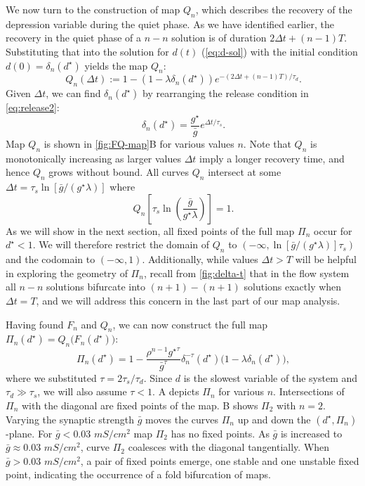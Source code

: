 \documentclass[utf8]{frontiersFPHY} %
\newcommand{\dstar}{d^\star}
\newcommand{\gbar}{\bar g}
\newcommand{\delt}{\Delta t}
\newcommand{\dn}{\delta_n}
\begin{document}
We now turn to the construction of map $Q_{n}$, which describes the recovery of the depression variable during the quiet phase.
As we have identified earlier, the recovery in the quiet phase of a $n-n$ solution is of duration $2\delt +(n-1)T$.
Substituting that into the solution for $d(t)$ (\cref{eq:d-sol}) with the initial condition $d(0)=\dn(\dstar)$ yields the map $Q_{n}$:
\begin{equation}
 ~\label{eq:Qn-map}
  Q_{n}(\delt):=1- (1- \lambda \dn(\dstar))e^{-(2\Delta t+(n-1)T)/\tau_{d}}.
\end{equation}
Given $\delt$, we can find $\dn(\dstar)$ by rearranging the release condition in \cref{eq:release2}:
\begin{equation}
 ~\label{eq:dn}
  \dn(\dstar) = \frac{g^{\star}}{\gbar} e^{\delt/\tau_{s}}.
\end{equation}
Map $Q_{n}$ is shown in \cref{fig:FQ-map}B for various values $n$.
Note that $Q_{n}$ is monotonically increasing as larger values $\delt$ imply a longer recovery time, and hence $Q_{n}$ grows without bound.
All curves $Q_{n}$ intersect at some $\delt = \tau_{s}\ln{\left[\gbar/(g^{\star}\lambda)\right]}$ where
\begin{equation}
     ~\label{eq:Qn-intersect}
      Q_{n}\left[\tau_{s}\ln{\left(\frac{\gbar}{g^{\star}\lambda}\right)}\right]=1.
    \end{equation}
As we will show in the next section, all fixed points of the full map $\Pi_{n}$ occur for $d^{\star}<1$.
We will therefore restrict the domain of $Q_{n}$ to $(-\infty, \ln{\left[\gbar/(g^{\star}\lambda)\right]}\tau_{s})$ and the codomain to $(-\infty, 1)$.
Additionally, while values $\delt>T$ will be helpful in exploring the geometry of $\Pi_{n}$, recall from \cref{fig:delta-t} that in the flow system all $n-n$ solutions bifurcate into $(n+1)-(n+1)$ solutions exactly when $\Delta t=T$, and we will address this concern in the last part of our map analysis.

Having found $F_{n}$ and $Q_{n}$, we can now construct the full map $\Pi_{n}(d^{\star})=Q_{n}\big(F_{n}(d^{\star})\big)$:
\begin{equation}
 ~\label{eq:Pn-map}
  \Pi_{n}(d^{\star})= 1-
\frac{\rho^{n-1}{g^{\star}}^{\tau}}{{\gbar}^{\tau}}\delta_{n}^{-\tau}(d^{\star})\big(1-\lambda\delta_{n}(d^{\star})\big),
\end{equation}
where we substituted $\tau = 2\tau_{s}/\tau_{d}$.
Since $d$ is the slowest variable of the system and $\tau_{d}\gg \tau_{s}$, we will also assume $\tau<1$.
A depicts $\Pi_{n}$ for various $n$.
Intersections of $\Pi_{n}$ with the diagonal are fixed points of the map.
B shows $\Pi_{2}$ with $n=2$.
Varying the synaptic strength $\gbar$ moves the curves $\Pi_{n}$ up and down the $(d^{\star}, \Pi_{n})$-plane.
For $\gbar<0.03$ $\si{mS/cm^{2}}$ map $\Pi_{2}$ has no fixed points.
As $\gbar$ is increased to $\gbar \approx 0.03$ $\si{mS/cm^{2}}$, curve $\Pi_{2}$ coalesces with the diagonal tangentially.
When $\gbar > 0.03$ $\si{mS/cm^{2}}$, a pair of fixed points emerge, one stable and one unstable fixed point, indicating the occurrence of a fold bifurcation of maps.
\end{document}
